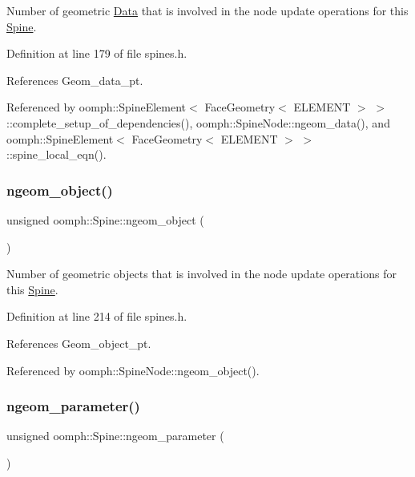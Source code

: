 Number of geometric \hyperlink{classoomph_1_1Data}{Data} that is involved in the node update operations for this \hyperlink{classoomph_1_1Spine}{Spine}. 



Definition at line 179 of file spines.\+h.



References Geom\+\_\+data\+\_\+pt.



Referenced by oomph\+::\+Spine\+Element$<$ Face\+Geometry$<$ E\+L\+E\+M\+E\+N\+T $>$ $>$\+::complete\+\_\+setup\+\_\+of\+\_\+dependencies(), oomph\+::\+Spine\+Node\+::ngeom\+\_\+data(), and oomph\+::\+Spine\+Element$<$ Face\+Geometry$<$ E\+L\+E\+M\+E\+N\+T $>$ $>$\+::spine\+\_\+local\+\_\+eqn().

\mbox{\label{classoomph_1_1Spine_a4ed777b5f3b4b1e464835ba945003877}} 
\subsubsection{\texorpdfstring{ngeom\+\_\+object()}{ngeom\_object()}}
{\footnotesize\ttfamily unsigned oomph\+::\+Spine\+::ngeom\+\_\+object (\begin{DoxyParamCaption}{ }\end{DoxyParamCaption})\hspace{0.3cm}{\ttfamily [inline]}}



Number of geometric objects that is involved in the node update operations for this \hyperlink{classoomph_1_1Spine}{Spine}. 



Definition at line 214 of file spines.\+h.



References Geom\+\_\+object\+\_\+pt.



Referenced by oomph\+::\+Spine\+Node\+::ngeom\+\_\+object().

\mbox{\label{classoomph_1_1Spine_a809b08740a5aa1be9d89f0b87b5863ba}} 
\subsubsection{\texorpdfstring{ngeom\+\_\+parameter()}{ngeom\_parameter()}}
{\footnotesize\ttfamily unsigned oomph\+::\+Spine\+::ngeom\+\_\+parameter (\begin{DoxyParamCaption}{ }\end{DoxyParamCaption})\hspace{0.3cm}{\ttfamily [inline]}}



